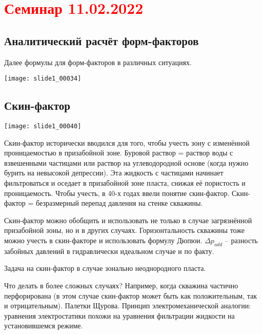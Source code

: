 \documentclass[main.tex]{subfiles}
\begin{document}
\section{\textcolor{red}{Семинар 11.02.2022}}

\subsection{Аналитический расчёт форм-факторов}

Далее формулы для форм-факторов в различных ситуациях.

\texttt{[image: slide1\_00034]}




\subsection{Скин-фактор}

\texttt{[image: slide1\_00040]}

Скин-фактор исторически вводился для того, чтобы учесть зону с изменённой проницаемостью в призабойной зоне. Буровой раствор = раствор воды с взвешенными частицами или раствор на углеводородной основе (когда нужно бурить на невысокой депрессии). Эта жидкость с частицами начинает фильтроваться и оседает в призабойной зоне пласта, снижая её пористость и проницаемость. Чтобы учесть, в 40-х годах ввели понятие скин-фактор. Скин-фактор = безразмерный перепад давления на стенке скважины.


Скин-фактор можно обобщить и использовать не только в случае загрязнённой призабойной зоны, но и в других случаях. Горизонтальность скважины тоже можно учесть в скин-факторе и использовать формулу Дюпюи.
$\Delta p_{add}$ -- разность забойных давлений в гидравлически идеальном случае и по факту.


Задача на скин-фактор в случае зонально неоднородного пласта.


Что делать в более сложных случаях? Например, когда скважина частично перфорирована (в этом случае скин-фактор может быть как положительным, так и отрицательным). Палетки Щурова. Принцип электромеханической аналогии: уравнения электростатики похожи на уравнения фильтрации жидкости на установившемся режиме.
\end{document}
